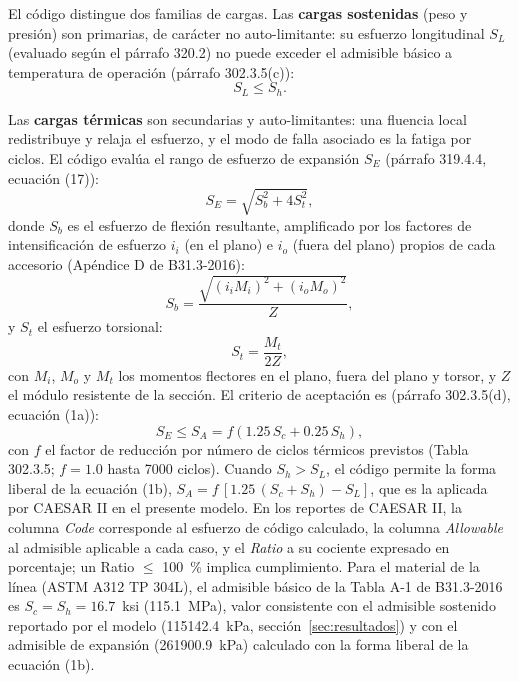 El c\'{o}digo distingue dos familias de cargas. Las \textbf{cargas sostenidas}
(peso y presi\'{o}n) son primarias, de car\'{a}cter no auto-limitante: su esfuerzo
longitudinal $S_L$ (evaluado seg\'{u}n el p\'{a}rrafo 320.2) no puede exceder el
admisible b\'{a}sico a temperatura de operaci\'{o}n (p\'{a}rrafo 302.3.5(c)):
\begin{equation}
    S_L \leq S_h.
    \label{eq:sl}
\end{equation}

Las \textbf{cargas t\'{e}rmicas} son secundarias y auto-limitantes: una fluencia
local redistribuye y relaja el esfuerzo, y el modo de falla asociado es la fatiga
por ciclos. El c\'{o}digo eval\'{u}a el rango de esfuerzo de expansi\'{o}n $S_E$
(p\'{a}rrafo 319.4.4, ecuaci\'{o}n (17)):
\begin{equation}
    S_E = \sqrt{S_b^2 + 4 S_t^2},
    \label{eq:se}
\end{equation}
donde $S_b$ es el esfuerzo de flexi\'{o}n resultante, amplificado por los
factores de intensificaci\'{o}n de esfuerzo $i_i$ (en el plano) e $i_o$ (fuera del
plano) propios de cada accesorio (Ap\'{e}ndice D de B31.3-2016):
\begin{equation}
    S_b = \frac{\sqrt{(i_i M_i)^2 + (i_o M_o)^2}}{Z},
    \label{eq:sb}
\end{equation}
y $S_t$ el esfuerzo torsional:
\begin{equation}
    S_t = \frac{M_t}{2 Z},
    \label{eq:st}
\end{equation}
con $M_i$, $M_o$ y $M_t$ los momentos flectores en el plano, fuera del plano y
torsor, y $Z$ el m\'{o}dulo resistente de la secci\'{o}n. El criterio de
aceptaci\'{o}n es (p\'{a}rrafo 302.3.5(d), ecuaci\'{o}n (1a)):
\begin{equation}
    S_E \leq S_A = f \left( 1.25 \, S_c + 0.25 \, S_h \right),
    \label{eq:sa}
\end{equation}
con $f$ el factor de reducci\'{o}n por n\'{u}mero de ciclos t\'{e}rmicos previstos
(Tabla 302.3.5; $f = 1.0$ hasta 7000 ciclos). Cuando $S_h > S_L$, el c\'{o}digo
permite la forma liberal de la ecuaci\'{o}n (1b),
$S_A = f\,[1.25\,(S_c + S_h) - S_L]$, que es la aplicada por CAESAR II en el
presente modelo. En los reportes de CAESAR II, la columna \textit{Code}
corresponde al esfuerzo de c\'{o}digo calculado, la columna \textit{Allowable} al
admisible aplicable a cada caso, y el \textit{Ratio} a su cociente expresado en
porcentaje; un Ratio $\leq$ 100~\% implica cumplimiento. Para el material de la
l\'{i}nea (ASTM A312 TP 304L), el admisible b\'{a}sico de la Tabla A-1 de
B31.3-2016 es $S_c = S_h = 16.7$~ksi (\num{115.1}~\si{MPa}), valor consistente
con el admisible sostenido reportado por el modelo (\num{115142.4}~\si{kPa},
secci\'{o}n~\ref{sec:resultados}) y con el admisible de expansi\'{o}n
(\num{261900.9}~\si{kPa}) calculado con la forma liberal de la
ecuaci\'{o}n (1b).


